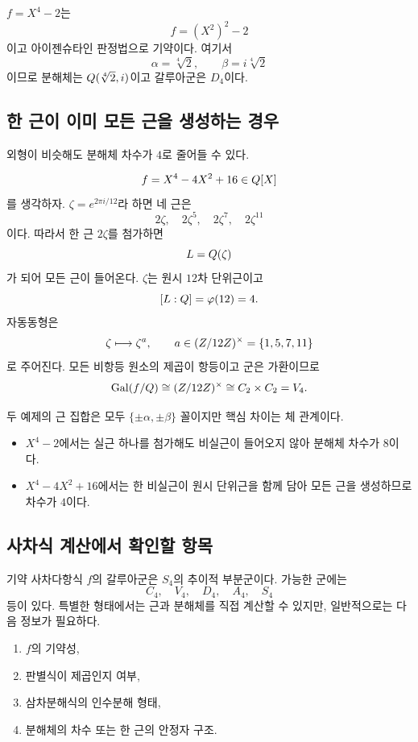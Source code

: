 \begin{example}
$f=X^4-2$는
\[
  f=(X^2)^2-2
\]
이고 아이젠슈타인 판정법으로 기약이다. 여기서
\[
  \alpha=\sqrt[4]{2},
  \qquad
  \beta=i\sqrt[4]{2}
\]
이므로 분해체는 $Q(\sqrt[4]{2},i)$이고 갈루아군은 $D_4$이다.
\end{example}

\subsection{한 근이 이미 모든 근을 생성하는 경우}

외형이 비슷해도 분해체 차수가 $4$로 줄어들 수 있다.

\begin{example}
\[
  f=X^4-4X^2+16\in Q[X]
\]
를 생각하자. $\zeta=e^{2\pi i/12}$라 하면 네 근은
\[
  2\zeta,\quad 2\zeta^5,\quad 2\zeta^7,\quad 2\zeta^{11}
\]
이다. 따라서 한 근 $2\zeta$를 첨가하면
\[
  L=Q(\zeta)
\]
가 되어 모든 근이 들어온다. $\zeta$는 원시 $12$차 단위근이고
\[
  [L:Q]=\varphi(12)=4.
\]
자동동형은
\[
  \zeta\longmapsto\zeta^a,
  \qquad
  a\in(Z/12Z)^\times=\{1,5,7,11\}
\]
로 주어진다. 모든 비항등 원소의 제곱이 항등이고 군은 가환이므로
\[
  \operatorname{Gal}(f/Q)
  \cong(Z/12Z)^\times
  \cong C_2\times C_2=V_4.
\]
\end{example}

\begin{remark}
두 예제의 근 집합은 모두 $\{\pm\alpha,\pm\beta\}$ 꼴이지만 핵심 차이는 체 관계이다.
\begin{itemize}
  \item $X^4-2$에서는 실근 하나를 첨가해도 비실근이 들어오지 않아 분해체 차수가 $8$이다.
  \item $X^4-4X^2+16$에서는 한 비실근이 원시 단위근을 함께 담아 모든 근을 생성하므로 차수가 $4$이다.
\end{itemize}
\end{remark}

\subsection{사차식 계산에서 확인할 항목}

기약 사차다항식 $f$의 갈루아군은 $S_4$의 추이적 부분군이다. 가능한 군에는
\[
  C_4,\quad V_4,\quad D_4,\quad A_4,\quad S_4
\]
등이 있다. 특별한 형태에서는 근과 분해체를 직접 계산할 수 있지만, 일반적으로는 다음 정보가 필요하다.

\begin{enumerate}
  \item $f$의 기약성,
  \item 판별식이 제곱인지 여부,
  \item 삼차분해식의 인수분해 형태,
  \item 분해체의 차수 또는 한 근의 안정자 구조.
\end{enumerate}

